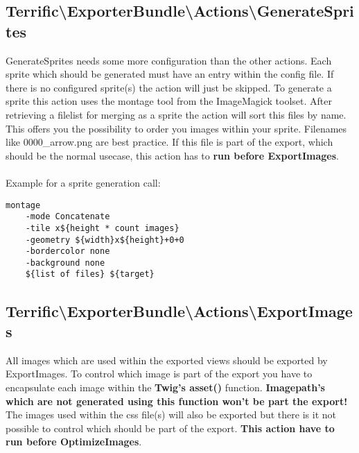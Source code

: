 \noindent \begin{minipage}{\textwidth}
\vspace{1.5em}
\hypertarget{sec-Actions-GenerateSprites}{\subsection{Terrific\textnormal{\textbackslash}ExporterBundle\textnormal{\textbackslash}Actions\textnormal{\textbackslash}GenerateSprites}}
GenerateSprites needs some more configuration than the other actions. Each sprite which should be generated must have an entry within the config file. If there is no configured sprite(s) the action will just be skipped. To generate a sprite this action uses the montage tool from the ImageMagick toolset. After retrieving a filelist for merging as a sprite the action will sort this files by name. This offers you the possibility to order you images within your sprite. Filenames like 0000\_arrow.png are best practice. If this file is part of the export, which should be the normal usecase, this action has to \textbf{run before ExportImages}.\\
\\
Example for a sprite generation call:
\begin{verbatim}
montage
    -mode Concatenate
    -tile x${height * count images}
    -geometry ${width}x${height}+0+0
    -bordercolor none
    -background none
    ${list of files} ${target}
\end{verbatim}
\end{minipage}

\noindent \begin{minipage}{\textwidth}
\vspace{1.5em}
\hypertarget{sec-Actions-ExportImages}{\subsection{Terrific\textnormal{\textbackslash}ExporterBundle\textnormal{\textbackslash}Actions\textnormal{\textbackslash}ExportImages}}
All images which are used within the exported views should be exported by ExportImages. To control which image is part of the export you have to encapsulate each image within the \textbf{Twig's asset()} function. \textbf{Imagepath's which are not generated using this function won't be part the export!} The images used within the css file(s) will also be exported but there is it not possible to control which should be part of the export. \textbf{This action have to run before OptimizeImages}.
\end{minipage}

